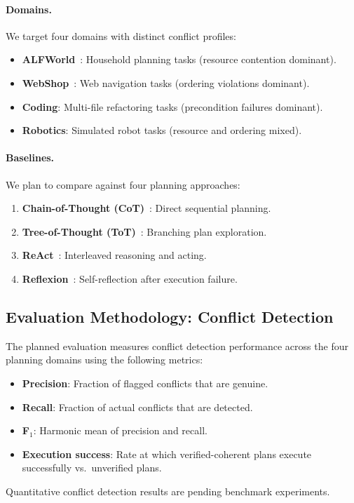 \documentclass[11pt]{article}
\begin{document}
\paragraph{Domains.}
We target four domains with distinct conflict profiles:
\begin{itemize}[noitemsep]
  \item \textbf{ALFWorld}~\cite{Shridhar2021alfworld}: Household
        planning tasks (resource contention dominant).
  \item \textbf{WebShop}~\cite{Yao2022webshop}: Web navigation tasks
        (ordering violations dominant).
  \item \textbf{Coding}: Multi-file refactoring tasks
        (precondition failures dominant).
  \item \textbf{Robotics}: Simulated robot tasks
        (resource and ordering mixed).
\end{itemize}

\paragraph{Baselines.}
We plan to compare against four planning approaches:
\begin{enumerate}[noitemsep]
  \item \textbf{Chain-of-Thought (CoT)}~\cite{Wei2022cot}: Direct
        sequential planning.
  \item \textbf{Tree-of-Thought (ToT)}~\cite{Yao2023tot}: Branching
        plan exploration.
  \item \textbf{ReAct}~\cite{Yao2023react}: Interleaved reasoning and
        acting.
  \item \textbf{Reflexion}~\cite{Shinn2023reflexion}: Self-reflection
        after execution failure.
\end{enumerate}

\subsection{Evaluation Methodology: Conflict Detection}\label{ssec:detection-results}

The planned evaluation measures conflict detection performance across
the four planning domains using the following metrics:
\begin{itemize}[noitemsep]
  \item \textbf{Precision}: Fraction of flagged conflicts that are genuine.
  \item \textbf{Recall}: Fraction of actual conflicts that are detected.
  \item \textbf{F$_1$}: Harmonic mean of precision and recall.
  \item \textbf{Execution success}: Rate at which verified-coherent plans
        execute successfully vs.\ unverified plans.
\end{itemize}
Quantitative conflict detection results are pending benchmark experiments.
\end{document}
